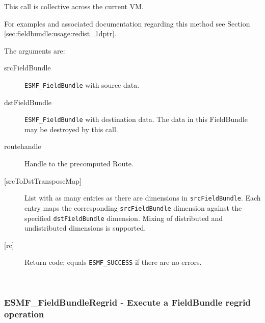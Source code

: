    This call is collective across the current VM.
  
   For examples and associated documentation regarding this method see Section
   \ref{sec:fieldbundle:usage:redist_1dptr}.
  
   The arguments are:
   \begin{description}
   \item [srcFieldBundle]
   {\tt ESMF\_FieldBundle} with source data.
   \item [dstFieldBundle]
   {\tt ESMF\_FieldBundle} with destination data. The data in this
   FieldBundle may be destroyed by this call.
   \item [routehandle]
   Handle to the precomputed Route.
   \item [{[srcToDstTransposeMap]}]
   List with as many entries as there are dimensions in {\tt srcFieldBundle}. Each
   entry maps the corresponding {\tt srcFieldBundle} dimension
   against the specified {\tt dstFieldBundle}
   dimension. Mixing of distributed and undistributed dimensions is supported.
   \item [{[rc]}]
   Return code; equals {\tt ESMF\_SUCCESS} if there are no errors.
   \end{description}
   
 
\mbox{}\hrulefill\ 
 
\subsubsection [ESMF\_FieldBundleRegrid] {ESMF\_FieldBundleRegrid - Execute a FieldBundle regrid operation}


